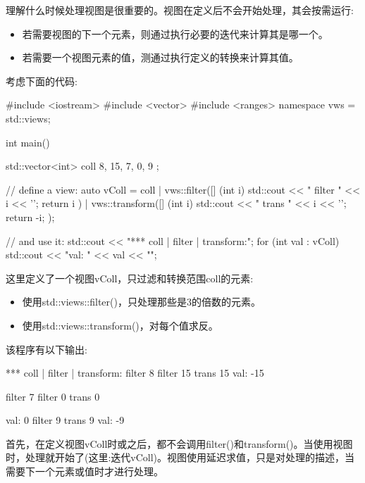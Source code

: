 
理解什么时候处理视图是很重要的。视图在定义后不会开始处理，其会按需运行:

\begin{itemize}
\item
若需要视图的下一个元素，则通过执行必要的迭代来计算其是哪一个。

\item
若需要一个视图元素的值，测通过执行定义的转换来计算其值。
\end{itemize}

考虑下面的代码:


\begin{cpp}
#include <iostream>
#include <vector>
#include <ranges>
namespace vws = std::views;

int main()
{
	std::vector<int> coll{ 8, 15, 7, 0, 9 };
	
	// define a view:
	auto vColl = coll
				| vws::filter([] (int i) {
					std::cout << " filter " << i << '\n';
					return i %
				})
				| vws::transform([] (int i) {
					std::cout << " trans " << i << '\n';
					return -i;
				});
				
	// and use it:
	std::cout << "*** coll | filter | transform:\n";
	for (int val : vColl) {
		std::cout << "val: " << val << "\n\n";
	}
}
\end{cpp}

这里定义了一个视图vColl，只过滤和转换范围coll的元素:

\begin{itemize}
\item
使用std::views::filter()，只处理那些是3的倍数的元素。

\item
使用std::views::transform()，对每个值求反。
\end{itemize}

该程序有以下输出:

\begin{shell}
*** coll | filter | transform:
filter 8
filter 15
trans 15
val: -15

filter 7
filter 0
trans 0

val: 0
filter 9
trans 9
val: -9
\end{shell}

首先，在定义视图vColl时或之后，都不会调用filter()和transform()。当使用视图时，处理就开始了(这里:迭代vColl)。视图使用延迟求值，只是对处理的描述，当需要下一个元素或值时才进行处理。

